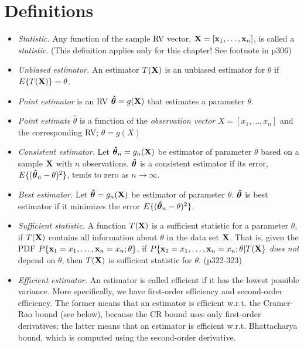 \documentclass[a4paper]{book}
\begin{document}
\section{Definitions}
\begin{itemize}
\item \textit{Statistic.} Any function of the sample RV vector, $\mathbf{X}=[\mathbf{x}_1,\hdots,\mathbf{x}_n]$, is called a \textit{statistic}. (This definition applies only for this chapter! See footnote in p306)
\item \textit{Unbiased estimator.} An estimator $T(\mathbf{X})$ is an unbiased estimator for $\theta$ if $E\{T(\mathbf{X})\}=\theta$.
\item \textit{Point estimator} is an RV $\boldsymbol{\hat{\theta}}=g(\mathbf{X})$  that estimates a parameter $\theta$.
\item \textit{Point estimate} $\hat{\theta}$ is a function of the \textit{observation vector} $X=[x_1, \hdots, x_n]$ and the corresponding RV; \ie $\hat{\theta}=g(X)$
\item \textit{Consistent estimator.} Let $\boldsymbol{\hat{\theta}}_n=g_n(\mathbf{X})$ be estimator of parameter $\theta$ based on a sample $\mathbf{X}$ with $n$ observations. $\boldsymbol{\hat{\theta}}$ is a consistent estimator if its error, $E\{(\boldsymbol{\hat{\theta}}_n-\theta)^2\}$, tends to zero as $n\to \infty$.
\item \textit{Best estimator.} Let $\boldsymbol{\hat{\theta}}=g_n(\mathbf{X})$ be estimator of parameter $\theta$. $\boldsymbol{\hat{\theta}}$ is best estimator if it minimizes the error $E\{(\boldsymbol{\hat{\theta}}_n-\theta)^2\}$.
\item \textit{Sufficient statistic.} A function $T(\mathbf{X})$ is a sufficient statistic for a parameter $\theta$, if $T(\mathbf{X})$ contains all information about $\theta$ in the data set $\mathbf{X}$. That is, given the PDF $P\{\mathbf{x}_1=x_1,\hdots,\mathbf{x}_n=x_n; \theta\}$, if $P\{\mathbf{x}_1=x_1,\hdots,\mathbf{x}_n=x_n; \theta | T(\mathbf{X}\}$ \textit{does not} depend on $\theta$, then $T(\mathbf{X})$ is sufficient statistic for $\theta$. (p322-323)
\item \textit{Efficient estimator.} An estimator is called efficient if it has the lowest possible variance. More specifically, we have first-order efficiency and second-order efficiency. The former means that an estimator is efficient w.r.t. the Cramer-Rao bound (see below), because the CR bound uses only first-order derivatives; the latter means that an estimator is efficient w.r.t. Bhattacharya bound, which is computed using the second-order derivative.
\end{itemize}
\end{document}
